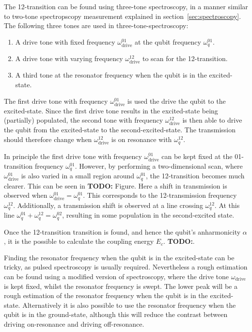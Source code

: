         The 12-transition can be found using three-tone spectroscopy, in a manner similar to two-tone spectropscopy measurement explained in section~\ref{sec:spectroscopy}. The following three tones are used in three-tone-spectroscopy:

        \begin{enumerate}
          \item A drive tone with fixed frequency $\omega_\text{drive}^{01}$ at the qubit frequency $\omega_q^{01}$.
          \item A drive tone with varying frequency $\omega_\text{drive}^{12}$ to scan for the 12-transition.
          \item A third tone at the resonator frequency when the qubit is in the excited-state.
        \end{enumerate}

        The first drive tone with frequency $\omega_\text{drive}^{01}$ is used the drive the qubit to the excited-state. Since the first drive tone results in the excited-state being (partially) populated, the second tone with frequency $\omega_\text{drive}^{12}$ is then able to drive the qubit from the excited-state to the second-excited-state. The transmission should therefore change when $\omega_\text{drive}^{12}$ is on resonance with $\omega_q^{12}$.

        In principle the first drive tone with frequency $\omega_\text{drive}^{01}$ can be kept fixed at the 01-transition frequency $\omega_q^{01}$. However, by performing a two-dimensional scan, where $\omega_\text{drive}^{01}$ is also varied in a small region around $\omega_q^{01}$, the 12-transition becomes much clearer. This can be seen in \textbf{TODO:} Figure. Here a shift in transmission is observed when $\omega_\text{drive}^{01} = \omega_q^{01}$. This corresponds to the 12-transmission frequency $\omega_q^{12}$. Additionally, a transmission shift is observed at a line crossing $\omega_q^{12}$. At this line $\omega_q^{01} + \omega_q^{12} = \omega_q^{02}$, resulting in some population in the second-excited state.

        Once the 12-transition transition is found, and hence the qubit's anharmonicity $\alpha$, it is the possible to calculate the coupling energy $E_c$. \textbf{TODO:}.

        Finding the resonator frequency when the qubit is in the excited-state can be tricky, as pulsed spectroscopy is usually required. Nevertheless a rough estimation can be found using a modified version of spectroscopy, where the drive tone $\omega_\text{drive}$ is kept fixed, whilst the resonator frequency is swept. The lower peak will be a rough estimation of the resonator frequency when the qubit is in the excited-state. Alternatively it is also possible to use the resonator frequency when the qubit is in the ground-state, although this will reduce the contrast between driving on-resonance and driving off-resonance.

